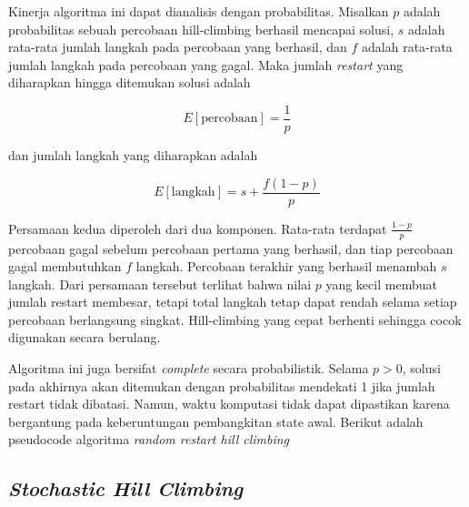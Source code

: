 Kinerja algoritma ini dapat dianalisis dengan probabilitas. Misalkan $p$ adalah probabilitas sebuah percobaan hill-climbing berhasil mencapai solusi, $s$ adalah rata-rata jumlah langkah pada percobaan yang berhasil, dan $f$ adalah rata-rata jumlah langkah pada percobaan yang gagal. Maka jumlah \textit{restart} yang diharapkan hingga ditemukan solusi adalah

\begin{equation}
    E[\text{percobaan}] = \frac{1}{p}
\end{equation}

dan jumlah langkah yang diharapkan adalah

\begin{equation}
    E[\text{langkah}] = s + \frac{f(1-p)}{p}
\end{equation}

Persamaan kedua diperoleh dari dua komponen. Rata-rata terdapat $\frac{1-p}{p}$ percobaan gagal sebelum percobaan pertama yang berhasil, dan tiap percobaan gagal membutuhkan $f$ langkah. Percobaan terakhir yang berhasil menambah $s$ langkah. Dari persamaan tersebut terlihat bahwa nilai $p$ yang kecil membuat jumlah restart membesar, tetapi total langkah tetap dapat rendah selama setiap percobaan berlangsung singkat. Hill-climbing yang cepat berhenti sehingga cocok digunakan secara berulang.

Algoritma ini juga bersifat \textit{complete} secara probabilistik. Selama $p > 0$, solusi pada akhirnya akan ditemukan dengan probabilitas mendekati 1 jika jumlah restart tidak dibatasi. Namun, waktu komputasi tidak dapat dipastikan karena bergantung pada keberuntungan pembangkitan state awal. Berikut adalah pseudocode algoritma \textit{random restart hill climbing}

\begin{algorithm}[H]
\caption{Random Restart Hill-Climbing}
\label{alg:random-restart-hill-climbing}
\end{algorithm}

\subsection{\textit{Stochastic Hill Climbing}}

